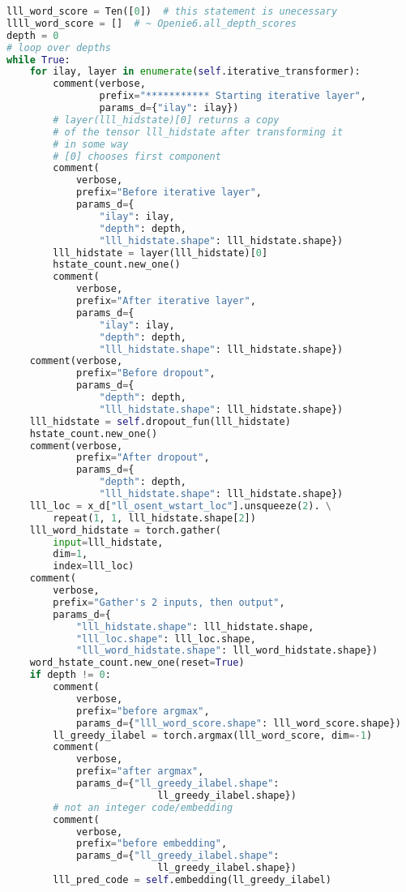 \documentclass[12pt]{article}
\begin{document}
\begin{lstlisting}[language=Python]
lll_word_score = Ten([0])  # this statement is unecessary
llll_word_score = []  # ~ Openie6.all_depth_scores
depth = 0
# loop over depths
while True:
    for ilay, layer in enumerate(self.iterative_transformer):
        comment(verbose,
                prefix="*********** Starting iterative layer",
                params_d={"ilay": ilay})
        # layer(lll_hidstate)[0] returns a copy
        # of the tensor lll_hidstate after transforming it
        # in some way
        # [0] chooses first component
        comment(
            verbose,
            prefix="Before iterative layer",
            params_d={
                "ilay": ilay,
                "depth": depth,
                "lll_hidstate.shape": lll_hidstate.shape})
        lll_hidstate = layer(lll_hidstate)[0]
        hstate_count.new_one()
        comment(
            verbose,
            prefix="After iterative layer",
            params_d={
                "ilay": ilay,
                "depth": depth,
                "lll_hidstate.shape": lll_hidstate.shape})
    comment(verbose,
            prefix="Before dropout",
            params_d={
                "depth": depth,
                "lll_hidstate.shape": lll_hidstate.shape})
    lll_hidstate = self.dropout_fun(lll_hidstate)
    hstate_count.new_one()
    comment(verbose,
            prefix="After dropout",
            params_d={
                "depth": depth,
                "lll_hidstate.shape": lll_hidstate.shape})
    lll_loc = x_d["ll_osent_wstart_loc"].unsqueeze(2). \
        repeat(1, 1, lll_hidstate.shape[2])
    lll_word_hidstate = torch.gather(
        input=lll_hidstate,
        dim=1,
        index=lll_loc)
    comment(
        verbose,
        prefix="Gather's 2 inputs, then output",
        params_d={
            "lll_hidstate.shape": lll_hidstate.shape,
            "lll_loc.shape": lll_loc.shape,
            "lll_word_hidstate.shape": lll_word_hidstate.shape})
    word_hstate_count.new_one(reset=True)
    if depth != 0:
        comment(
            verbose,
            prefix="before argmax",
            params_d={"lll_word_score.shape": lll_word_score.shape})
        ll_greedy_ilabel = torch.argmax(lll_word_score, dim=-1)
        comment(
            verbose,
            prefix="after argmax",
            params_d={"ll_greedy_ilabel.shape":
                          ll_greedy_ilabel.shape})
        # not an integer code/embedding
        comment(
            verbose,
            prefix="before embedding",
            params_d={"ll_greedy_ilabel.shape":
                          ll_greedy_ilabel.shape})
        lll_pred_code = self.embedding(ll_greedy_ilabel)

\end{lstlisting}
\end{document}
